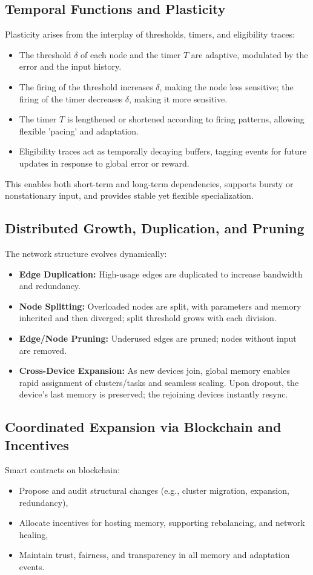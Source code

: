 \documentclass[11pt]{article}
\begin{document}
\subsection{Temporal Functions and Plasticity}
Plasticity arises from the interplay of thresholds, timers, and eligibility traces:
\begin{itemize}
    \item The threshold \(\delta\) of each node and the timer \(T\) are adaptive, modulated by the error and the input history.
    \item The firing of the threshold increases \(\delta\), making the node less sensitive; the firing of the timer decreases \(\delta\), making it more sensitive.
    \item The timer \(T\) is lengthened or shortened according to firing patterns, allowing flexible 'pacing' and adaptation.
    \item Eligibility traces act as temporally decaying buffers, tagging events for future updates in response to global error or reward.
\end{itemize}
This enables both short-term and long-term dependencies, supports bursty or nonstationary input, and provides stable yet flexible specialization.

\subsection{Distributed Growth, Duplication, and Pruning}
The network structure evolves dynamically:
\begin{itemize}
    \item \textbf{Edge Duplication:} High-usage edges are duplicated to increase bandwidth and redundancy.
    \item \textbf{Node Splitting:} Overloaded nodes are split, with parameters and memory inherited and then diverged; split threshold grows with each division.
    \item \textbf{Edge/Node Pruning:} Underused edges are pruned; nodes without input are removed.
    \item \textbf{Cross-Device Expansion:} As new devices join, global memory enables rapid assignment of clusters/tasks and seamless scaling. Upon dropout, the device's last memory is preserved; the rejoining devices instantly resync.
\end{itemize}

\subsection{Coordinated Expansion via Blockchain and Incentives}
Smart contracts on blockchain:
\begin{itemize}
    \item Propose and audit structural changes (e.g., cluster migration, expansion, redundancy),
    \item Allocate incentives for hosting memory, supporting rebalancing, and network healing,
    \item Maintain trust, fairness, and transparency in all memory and adaptation events.
\end{itemize}
\end{document}
